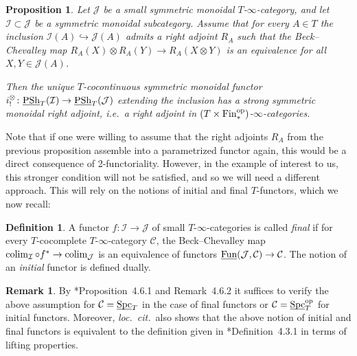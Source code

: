 \documentclass[reqno]{memo-l}
\theoremstyle{mythm}
\newtheorem{prop}[thm]{Proposition}
\theoremstyle{definition}
\newtheorem{rk}[thm]{Remark}
\newtheorem{definition}[thm]{Definition}
\numberwithin{equation}{section}
\newcommand{\Cc}{{\mathcal{C}}}
\newcommand{\Ii}{{\mathcal{I}}}
\newcommand{\Jj}{{\mathcal J}}
\DeclareMathOperator{\Spc}{Spc}
\newcommand{\Fun}{{\textup{Fun}}}
\DeclareMathOperator{\PSh}{PSh}
\newcommand{\op}{{\textup{op}}}
\newcommand{\colim}{\mathop{\textup{colim}}}
\newcommand{\ulhelper}[2]{\underline{\setbox0=\hbox{$#1#2$}\dp0=0.4pt \box0\relax}}
\newcommand{\ul}[1]{{\mathpalette\ulhelper{#1}}\hbox{\rule[-2pt]{0pt}{0pt}}}
\begin{document}
\begin{prop}\label{prop:Day-restriction}
    Let $\Jj$ be a small symmetric monoidal $T$-$\infty$-category, and let $\Ii\subset \Jj$ be a symmetric monoidal subcategory. Assume that for every $A\in T$ the inclusion $\Ii(A)\hookrightarrow\Jj(A)$ admits a right adjoint $R_A$ such that the Beck--Chevalley map $R_A(X)\otimes R_A(Y)\to R_A(X\otimes Y)$ is an equivalence for all $X,Y\in\Jj(A)$.

    Then the unique $T$-cocontinuous symmetric monoidal functor $i_!^\otimes\colon\ul\PSh_T(\Ii)\to\ul\PSh_T(\Jj)$ extending the inclusion has a strong symmetric monoidal right adjoint, i.e.\ a right adjoint in $(T\times\textup{Fin}_*^\op)$-$\infty$-categories.
\end{prop}

Note that if one were willing to assume that the right adjoints $R_A$ from the previous proposition assemble into a parametrized functor again, this would be a direct consequence of 2-functoriality. However, in the example of interest to us, this stronger condition will not be satisfied, and so we will need a different approach. This will rely on the notions of initial and final $T$-functors, which we now recall:

\begin{definition}
    A functor $f\colon\Ii\to\Jj$ of small $T$-$\infty$-categories is called \emph{final} if for every $T$-cocomplete $T$-$\infty$-category $\Cc$, the Beck--Chevalley map $\colim_{\Ii}\circ f^*\to\colim_\Jj$ is an equivalence of functors $\ul\Fun(\Jj,\Cc)\to \Cc$. The notion of an \emph{initial} functor is defined dually.
\end{definition}

\begin{rk}
    By \cite{martiniwolf2021limits}*{Proposition~4.6.1 and Remark~4.6.2} it suffices to verify the above assumption for $\Cc=\ul\Spc_T$ in the case of final functors or $\Cc=\ul\Spc_T^\op$ for initial functors. Moreover, \emph{loc.\ cit.}\ also shows that the above notion of initial and final functors is equivalent to the definition given in \cite{martini2021yoneda}*{Definition~4.3.1} in terms of lifting properties.
\end{rk}
\end{document}
